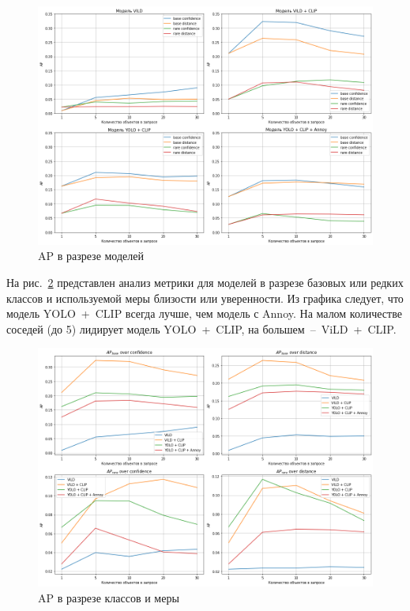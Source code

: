 \documentclass[a4paper,14pt]{article}
\begin{document}
    \begin{figure}[H]
        \centering
        \includegraphics[width=0.999\linewidth]{images/average_precision_dataset}
        \caption{AP в разрезе моделей}
        \label{fig:average_precision_dataset}
    \end{figure}

    На рис.~\ref{fig:average_precision_metrics} представлен анализ метрики для моделей в разрезе базовых или редких классов и используемой меры близости или уверенности.
    Из графика следует, что модель YOLO~+~CLIP всегда лучше, чем модель с Annoy.
    На малом количестве соседей (до 5) лидирует модель YOLO~+~CLIP, на большем~--~ViLD~+~CLIP.

    \begin{figure}[H]
        \centering
        \includegraphics[width=0.999\linewidth]{images/average_precision_metrics}
        \caption{AP в разрезе классов и меры}
        \label{fig:average_precision_metrics}
    \end{figure}
\end{document}
